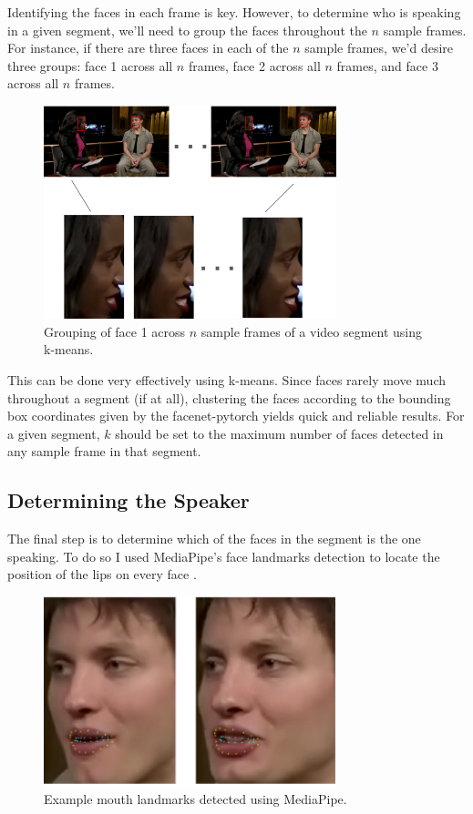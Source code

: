 \documentclass{article}
\begin{document}
Identifying the faces in each frame is key. However, to determine who is speaking in a given segment, we'll need to group the faces throughout the $n$ sample frames. For instance, if there are three faces in each of the $n$ sample frames, we'd desire three groups: face 1 across all $n$ frames, face 2 across all $n$ frames, and face 3 across all $n$ frames.

\begin{figure}[htb]
\begin{minipage}[b]{1.0\linewidth}
    \centering
    \centerline{\includegraphics[width=8.5cm]{k-means-face-detections.png}}
    \medskip
\end{minipage}
\caption{Grouping of face 1 across $n$ sample frames of a video segment using k-means.}
\label{fig:k-means-face-detections}
\end{figure}

This can be done very effectively using k-means. Since faces rarely move much throughout a segment (if at all), clustering the faces according to the bounding box coordinates given by the facenet-pytorch yields quick and reliable results. For a given segment, $k$ should be set to the maximum number of faces detected in any sample frame in that segment.

\subsection{Determining the Speaker}
The final step is to determine which of the faces in the segment is the one speaking. To do so I used MediaPipe's face landmarks detection to locate the position of the lips on every face \cite{MediaPipe}.
\begin{figure}[htb]
\begin{minipage}[b]{1.0\linewidth}
    \centering
    \centerline{\includegraphics[width=8.5cm]{face-landmarks.png}}
    \medskip
\end{minipage}
\caption{Example mouth landmarks detected using MediaPipe.}
\label{fig:face-landmarks}
\end{figure}
\end{document}

